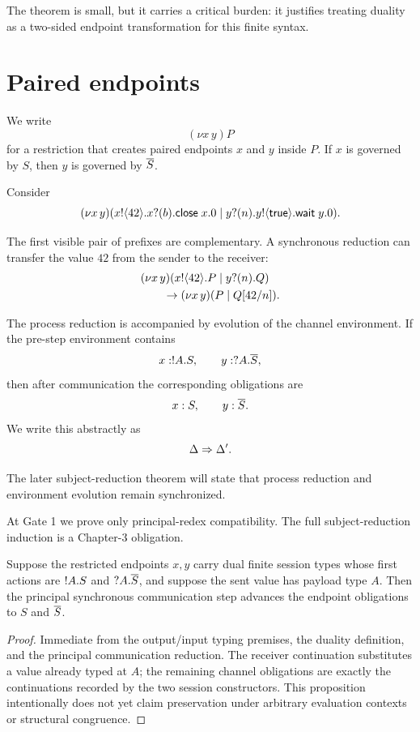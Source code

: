The theorem is small, but it carries a critical burden: it justifies treating duality as a
two-sided endpoint transformation for this finite syntax.

\section{Paired endpoints}

We write
\[
  (\nu x\,y)P
\]
for a restriction that creates paired endpoints \(x\) and \(y\) inside \(P\). If \(x\) is governed
by \(S\), then \(y\) is governed by \(\overline{S}\).

Consider
\[
(\nu x\,y)(
  x!\langle 42\rangle.x?(b).\mathsf{close}\;x.0
  \mid
  y?(n).y!\langle \mathsf{true}\rangle.\mathsf{wait}\;y.0
).
\]

The first visible pair of prefixes are complementary. A synchronous reduction can transfer the
value \(42\) from the sender to the receiver:
\[
\begin{aligned}
&(\nu x\,y)(
  x!\langle 42\rangle.P
  \mid
  y?(n).Q
)\\
&\qquad \to
(\nu x\,y)(
  P
  \mid
  Q[42/n]
).
\end{aligned}
\]



\begin{formal}
The process reduction is accompanied by evolution of the channel environment.
If the pre-step environment contains
\[
  x:!A.S,\qquad y:?A.\overline{S},
\]
then after communication the corresponding obligations are
\[
  x:S,\qquad y:\overline{S}.
\]
We write this abstractly as
\[
   \Delta \Rightarrow \Delta'.
\]

The later subject-reduction theorem will state that process reduction and environment evolution
remain synchronized.
\end{formal}

At Gate 1 we prove only principal-redex compatibility. The full subject-reduction induction is a
Chapter-3 obligation.

\begin{proposition}
Suppose the restricted endpoints \(x,y\) carry dual finite session types whose first actions are
\(!A.S\) and \(?A.\overline{S}\), and suppose the sent value has payload type \(A\).
Then the principal synchronous communication step advances the endpoint obligations to
\(S\) and \(\overline{S}\).
\end{proposition}

\begin{proof}
Immediate from the output/input typing premises, the duality definition, and the principal
communication reduction. The receiver continuation substitutes a value already typed at \(A\);
the remaining channel obligations are exactly the continuations recorded by the two session
constructors. This proposition intentionally does not yet claim preservation under arbitrary
evaluation contexts or structural congruence.
\end{proof}

